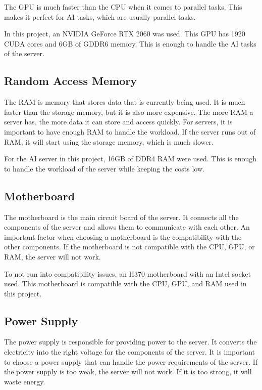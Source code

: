 The GPU is much faster than the CPU when it comes to parallel tasks. This makes it perfect for AI tasks, which are usually parallel tasks. 


In this project, an NVIDIA GeForce RTX 2060 was used. This GPU has 1920 CUDA cores and 6GB of GDDR6 memory. This is enough to handle the AI tasks of the server.

\cite{GPU}
\cite{GF2060}

\subsection{Random Access Memory}

The RAM is memory that stores data that is currently being used. It is much faster than the storage memory, but it is also more expensive. The more RAM a server has, the more data it can store and access quickly.
For servers, it is important to have enough RAM to handle the workload. If the server runs out of RAM, it will start using the storage memory, which is much slower.

For the AI server in this project, 16GB of DDR4 RAM were used. This is enough to handle the workload of the server while keeping the costs low.

\cite{RAM}

\subsection{Motherboard}

The motherboard is the main circuit board of the server. It connects all the components of the server and allows them to communicate with each other.
An important factor when choosing a motherboard is the compatibility with the other components. If the motherboard is not compatible with the CPU, GPU, or RAM, the server will not work.

To not run into compatibility issues, an H370 motherboard with an Intel socket used. This motherboard is compatible with the CPU, GPU, and RAM used in this project.

\cite{Motherboard}

\subsection{Power Supply}

The power supply is responsible for providing power to the server. It converts the electricity into the right voltage for the components of the server.
It is important to choose a power supply that can handle the power requirements of the server. If the power supply is too weak, the server will not work. If it is too strong, it will waste energy.

